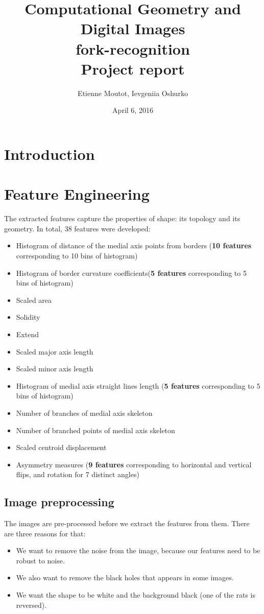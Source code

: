 \documentclass[12pt]{article}
\begin{document}
\title{
Computational Geometry and Digital Images \\
\textbf{fork-recognition}\\
Project report
}

\author{Etienne Moutot, Ievgeniia Oshurko}
\date{April 6, 2016}
\maketitle


\section{Introduction}  

\section{Feature Engineering}

The extracted features capture the properties of shape: its topology and its geometry. In total, 38 features were developed:

\begin{itemize}
	\item Histogram of distance of the medial axis points from borders (\textbf{10 features} corresponding to 10 bins of histogram)
	\item Histogram of border curvature coefficients(\textbf{5 features} corresponding to 5 bins of histogram)
	\item Scaled area
	\item Solidity
	\item Extend
	\item Scaled major axis length
	\item Scaled minor axis length
	\item Histogram of medial axis straight lines length (\textbf{5 features} corresponding to 5 bins of histogram)
	\item Number of branches of medial axis skeleton
	\item Number of branched points of medial axis skeleton
	\item Scaled centroid displacement
	\item Asymmetry measures (\textbf{9 features} corresponding to horizontal and vertical flips, and rotation for 7 distinct angles)
\end{itemize} 

\subsection{Image preprocessing}
The images are pre-processed before we extract the features from them. There are three reasons for that:
\begin{itemize}
	\item We want to remove the noise from the image, because our features need to be robust to noise.
        \item We also want to remove the black holes that appears in some images.
        \item We want the shape to be white and the background black (one of the rats is reversed).
\end{itemize}
\end{document}
